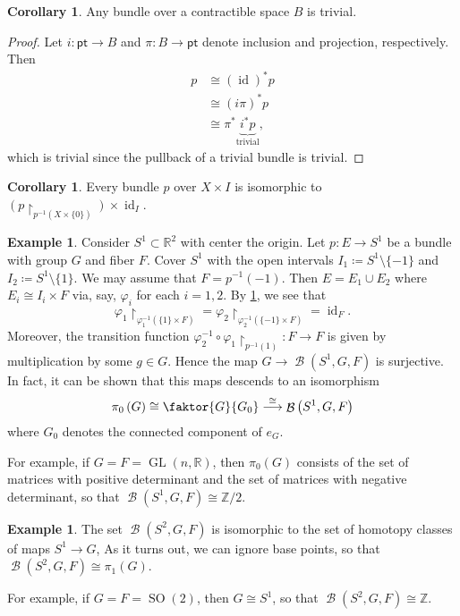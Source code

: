 \documentclass[10pt,letterpaper,cm]{nupset}
\theoremstyle{definition}
\newtheorem{exmp}[defn]{Example}
\theoremstyle{theorem}
\newtheorem{corollary}[defn]{Corollary}
\theoremstyle{remark}
\newcommand{\R}{\mathbb{R}}
\newcommand{\Z}{\mathbb Z}
\newcommand{\1}{\mathbb{1}}
\newcommand{\0}{\vec 0}
\newcommand{\pt}{\mathsf{pt}}
\DeclareMathOperator{\id}{id}
\DeclareMathOperator{\GL}{GL}
\DeclareMathOperator{\SO}{SO}
\DeclareMathOperator{\B}{\mathcal{B}}
\begin{document}
\begin{corollary}
Any bundle over a contractible space $B$ is trivial.
\end{corollary}
\begin{proof}
Let $i : \pt \to B$ and $\pi : B \to \pt$ denote inclusion and projection, respectively. Then 
\begin{align*}
p &  \cong \left(\id\right)^{\ast}{p}
\\ & \cong \left(i{\pi}\right)^{\ast}{p}
\\ & \cong \pi^{\ast}\underbrace{{i^{\ast}}{p}}_{\text{trivial}},
\end{align*}
which is trivial since the pullback of a trivial bundle is trivial.
\end{proof}

\begin{corollary}\label{restiso}
Every bundle $p$ over $X\times I$ is isomorphic to $\left(p\restriction_{p^{-1}\left(X\times \{0\}\right)}\right) \times \id_I$.
\end{corollary}

\begin{exmp}
Consider $S^1 \subset \R^2$ with center the origin. Let $p: E \to S^1$ be a bundle with group $G$ and fiber $F$. Cover $S^1$ with the open intervals $I_1 \coloneqq S^1\setminus \{{-}1\}$ and $I_2 \coloneqq S^1\setminus \{1\}$. We may assume that $F= p^{-1}\left({-}1\right)$. Then $E = E_1 \cup E_2$ where $ E_i \cong I_i \times F$ via, say, $\varphi_i$ for each $i=1,2$. By \cref{restiso}, we see that $$\varphi_1\restriction_{\varphi_1^{-1}\left(\{1\} \times F\right)} = \varphi_2\restriction_{\varphi_2^{-1}\left(\{{-}1\} \times F\right)}= \id_F.$$ Moreover, the transition function $\varphi_2^{-1} \circ \varphi_1\restriction_{p^{-1}\left(1\right)} : F \to F$ is given by multiplication by some $g\in G$. Hence the map $G \to \B\left(S^1, G, F\right)$ is surjective. In fact, it can be shown that this maps descends to an isomorphism
$$\pi_0\left(G\right) \cong \faktor{G}{G_0} \overset{\cong}{\longrightarrow} \B\left(S^1, G, F\right)$$ 
where $G_0$ denotes the connected component of $e_G$. 

\smallskip

For example, if $G=F = \GL\left(n, \R\right)$, then $\pi_0(G)$ consists of the set of matrices with positive determinant and the set of matrices with negative determinant, so that $\B\left(S^1, G, F\right) \cong \Z/2$.
\end{exmp}

\begin{exmp}
The set $\B\left(S^2, G, F \right)$ is isomorphic to the set of homotopy classes of maps $S^1 \to G$, As it turns out, we can ignore base points, so that  $\B\left(S^2, G, F \right) \cong \pi_1\left(G\right)$. 

\smallskip

For example, if $G = F = \SO(2)$, then $G\cong S^1$, so that $\B\left(S^2, G, F \right) \cong \Z$.
\end{exmp}
\end{document}

